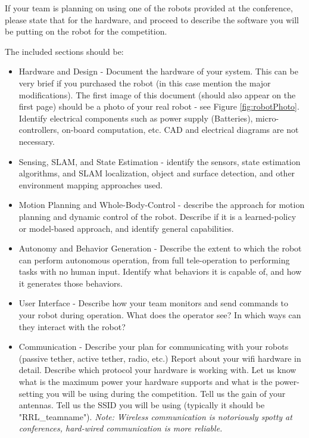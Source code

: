 \documentclass[journal]{IEEEtran}
\begin{document}
If your team is planning on using one of the robots provided at the conference, please state that for the hardware, and proceed to describe the software you will be putting on the robot for the competition. 

The included sections should be: 

\begin{itemize}
 \item Hardware and Design - Document the hardware of your system. This can be very brief if you purchased the robot (in this case mention the major modifications). The first image of this document (should also appear on the first page) should be a photo of your real robot - see Figure \ref{fig:robotPhoto}. Identify electrical components such as power supply (Batteries), micro-controllers, on-board computation, etc. CAD and electrical diagrams are not necessary. 
 \item Sensing, SLAM, and State Estimation - identify the sensors, state estimation algorithms, and SLAM localization, object and surface detection, and other environment mapping approaches used. 
 \item Motion Planning and Whole-Body-Control - describe the approach for motion planning and dynamic control of the robot. Describe if it is a learned-policy or model-based approach, and identify general capabilities.  
 \item Autonomy and Behavior Generation - Describe the extent to which the robot can perform autonomous operation, from full tele-operation to performing tasks with no human input. Identify what behaviors it is capable of, and how it generates those behaviors. 
 \item User Interface - Describe how your team monitors and send commands to your robot during operation. What does the operator see? In which ways can they interact with the robot?
 \item Communication - Describe your plan for communicating with your robots (passive tether, active tether, radio, etc.) Report about your wifi hardware in detail. Describe which protocol your hardware is working with. Let us know what is the maximum power your hardware supports and what is the power-setting you will be using during the competition.  Tell us the gain of your antennas. Tell us the SSID you will be using (typically it should be "RRL\_teamname").  \textit{Note: Wireless communication is notoriously spotty at conferences, hard-wired communication is more reliable.}
\end{itemize}
\end{document}

